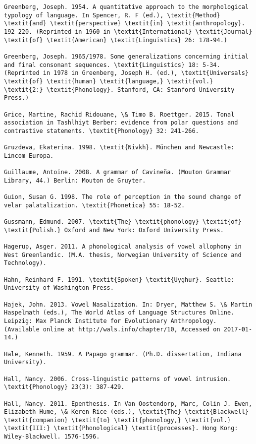 \begin{verbatim}
Greenberg, Joseph. 1954. A quantitative approach to the morphological typology of language. In Spencer, R. F (ed.), \textit{Method} \textit{and} \textit{perspective} \textit{in} \textit{anthropology}. 192-220. (Reprinted in 1960 in \textit{International} \textit{Journal} \textit{of} \textit{American} \textit{Linguistics} 26: 178-94.)

Greenberg, Joseph. 1965/1978. Some generalizations concerning initial and final consonant sequences. \textit{Linguistics} 18: 5-34. (Reprinted in 1978 in Greenberg, Joseph H. (ed.), \textit{Universals} \textit{of} \textit{human} \textit{language,} \textit{vol.} \textit{2:} \textit{Phonology}. Stanford, CA: Stanford University Press.) 

Grice, Martine, Rachid Ridouane, \& Timo B. Roettger. 2015. Tonal association in Tashlhiyt Berber: evidence from polar questions and contrastive statements. \textit{Phonology} 32: 241-266.

Gruzdeva, Ekaterina. 1998. \textit{Nivkh}. München and Newcastle: Lincom Europa.

Guillaume, Antoine. 2008. A grammar of Cavineña. (Mouton Grammar Library, 44.) Berlin: Mouton de Gruyter.

Guion, Susan G. 1998. The role of perception in the sound change of velar palatalization. \textit{Phonetica} 55: 18-52.

Gussmann, Edmund. 2007. \textit{The} \textit{phonology} \textit{of} \textit{Polish.} Oxford and New York: Oxford University Press.

Hagerup, Asger. 2011. A phonological analysis of vowel allophony in West Greenlandic. (M.A. thesis, Norwegian University of Science and Technology).

Hahn, Reinhard F. 1991. \textit{Spoken} \textit{Uyghur}. Seattle: University of Washington Press.

Hajek, John. 2013. Vowel Nasalization. In: Dryer, Matthew S. \& Martin Haspelmath (eds.), The World Atlas of Language Structures Online. Leipzig: Max Planck Institute for Evolutionary Anthropology. (Available online at http://wals.info/chapter/10, Accessed on 2017-01-14.)

Hale, Kenneth. 1959. A Papago grammar. (Ph.D. dissertation, Indiana University).

Hall, Nancy. 2006. Cross-linguistic patterns of vowel intrusion. \textit{Phonology} 23(3): 387-429.

Hall, Nancy. 2011. Epenthesis. In Van Oostendorp, Marc, Colin J. Ewen, Elizabeth Hume, \& Keren Rice (eds.), \textit{The} \textit{Blackwell} \textit{companion} \textit{to} \textit{phonology,} \textit{vol.} \textit{III:} \textit{Phonological} \textit{processes}. Hong Kong: Wiley-Blackwell. 1576-1596.


\end{verbatim}
